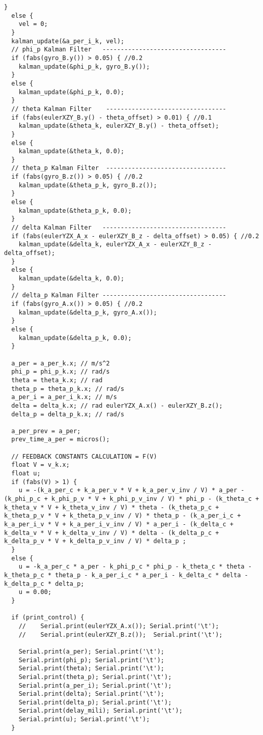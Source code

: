 \begin{lstlisting}[style=codearduino]
  }
  else {
    vel = 0;
  }
  kalman_update(&a_per_i_k, vel);
  // phi_p Kalman Filter   ----------------------------------
  if (fabs(gyro_B.y()) > 0.05) { //0.2
    kalman_update(&phi_p_k, gyro_B.y());
  }
  else {
    kalman_update(&phi_p_k, 0.0);
  }
  // theta Kalman Filter    ---------------------------------
  if (fabs(eulerXZY_B.y() - theta_offset) > 0.01) { //0.1
    kalman_update(&theta_k, eulerXZY_B.y() - theta_offset);
  }
  else {
    kalman_update(&theta_k, 0.0);
  }
  // theta_p Kalman Filter  ---------------------------------
  if (fabs(gyro_B.z()) > 0.05) { //0.2
    kalman_update(&theta_p_k, gyro_B.z());
  }
  else {
    kalman_update(&theta_p_k, 0.0);
  }
  // delta Kalman Filter   ----------------------------------
  if (fabs(eulerYZX_A_x - eulerXZY_B_z - delta_offset) > 0.05) { //0.2
    kalman_update(&delta_k, eulerYZX_A_x - eulerXZY_B_z - delta_offset);
  }
  else {
    kalman_update(&delta_k, 0.0);
  }
  // delta_p Kalman Filter ----------------------------------
  if (fabs(gyro_A.x()) > 0.05) { //0.2
    kalman_update(&delta_p_k, gyro_A.x());
  }
  else {
    kalman_update(&delta_p_k, 0.0);
  }

  a_per = a_per_k.x; // m/s^2
  phi_p = phi_p_k.x; // rad/s
  theta = theta_k.x; // rad
  theta_p = theta_p_k.x; // rad/s
  a_per_i = a_per_i_k.x; // m/s
  delta = delta_k.x; // rad eulerYZX_A.x() - eulerXZY_B.z();
  delta_p = delta_p_k.x; // rad/s

  a_per_prev = a_per;
  prev_time_a_per = micros();

  // FEEDBACK CONSTANTS CALCULATION = F(V)
  float V = v_k.x;
  float u;
  if (fabs(V) > 1) {
    u = -(k_a_per_c + k_a_per_v * V + k_a_per_v_inv / V) * a_per - (k_phi_p_c + k_phi_p_v * V + k_phi_p_v_inv / V) * phi_p - (k_theta_c + k_theta_v * V + k_theta_v_inv / V) * theta - (k_theta_p_c + k_theta_p_v * V + k_theta_p_v_inv / V) * theta_p - (k_a_per_i_c + k_a_per_i_v * V + k_a_per_i_v_inv / V) * a_per_i - (k_delta_c + k_delta_v * V + k_delta_v_inv / V) * delta - (k_delta_p_c + k_delta_p_v * V + k_delta_p_v_inv / V) * delta_p ;
  }
  else {
    u = -k_a_per_c * a_per - k_phi_p_c * phi_p - k_theta_c * theta - k_theta_p_c * theta_p - k_a_per_i_c * a_per_i - k_delta_c * delta - k_delta_p_c * delta_p;
    u = 0.00;
  }

  if (print_control) {
    //    Serial.print(eulerYZX_A.x()); Serial.print('\t');
    //    Serial.print(eulerXZY_B.z());  Serial.print('\t');
    
    Serial.print(a_per); Serial.print('\t');
    Serial.print(phi_p); Serial.print('\t');
    Serial.print(theta); Serial.print('\t');
    Serial.print(theta_p); Serial.print('\t');
    Serial.print(a_per_i); Serial.print('\t');
    Serial.print(delta); Serial.print('\t');
    Serial.print(delta_p); Serial.print('\t');
    Serial.print(delay_mili); Serial.print('\t');
    Serial.print(u); Serial.print('\t');
  }


\end{lstlisting}
